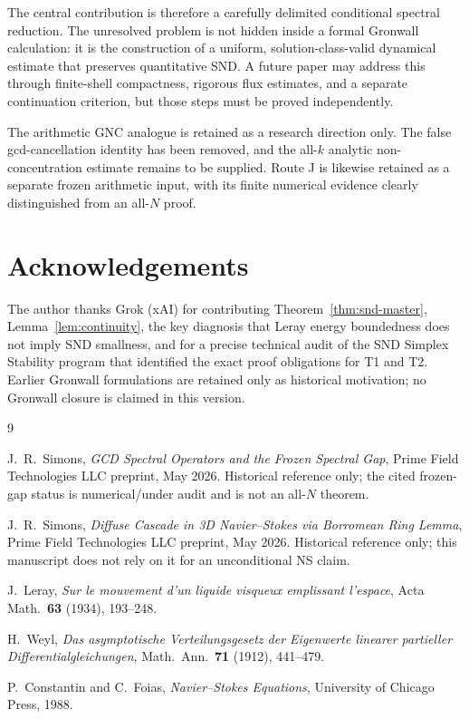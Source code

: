 \documentclass[12pt]{amsart}
\theoremstyle{definition}
\begin{document}
The central contribution is therefore a carefully delimited conditional
spectral reduction.  The unresolved problem is not hidden inside a
formal Gronwall calculation: it is the construction of a uniform,
solution-class-valid dynamical estimate that preserves quantitative SND.
A future paper may address this through finite-shell compactness,
rigorous flux estimates, and a separate continuation criterion, but
those steps must be proved independently.

The arithmetic GNC analogue is retained as a research direction only.
The false gcd-cancellation identity has been removed, and the all-$k$
analytic non-concentration estimate remains to be supplied.  Route J is
likewise retained as a separate frozen arithmetic input, with its
finite numerical evidence clearly distinguished from an all-$N$ proof.

\section*{Acknowledgements}

The author thanks Grok (xAI) for contributing
Theorem~\ref{thm:snd-master}, Lemma~\ref{lem:continuity},
the key diagnosis that Leray energy boundedness does not
imply SND smallness, and for a precise technical audit of the
SND Simplex Stability program that identified the exact
proof obligations for T1 and T2.
Earlier Gronwall formulations are retained only as historical motivation; no Gronwall closure is claimed in this version.

\begin{thebibliography}{9}

J.~R.~Simons,
\textit{GCD Spectral Operators and the Frozen Spectral Gap},
Prime Field Technologies LLC preprint, May 2026.
Historical reference only; the cited frozen-gap status is numerical/under audit and is not an all-$N$ theorem.

J.~R.~Simons,
\textit{Diffuse Cascade in 3D Navier--Stokes via Borromean Ring Lemma},
Prime Field Technologies LLC preprint, May 2026.
Historical reference only; this manuscript does not rely on it for an unconditional NS claim.

J.~Leray,
\textit{Sur le mouvement d'un liquide visqueux emplissant l'espace},
Acta Math.\ \textbf{63} (1934), 193--248.

H.~Weyl,
\textit{Das asymptotische Verteilungsgesetz der Eigenwerte linearer
partieller Differentialgleichungen},
Math.\ Ann.\ \textbf{71} (1912), 441--479.

P.~Constantin and C.~Foias,
\textit{Navier--Stokes Equations},
University of Chicago Press, 1988.

\end{thebibliography}
\end{document}
